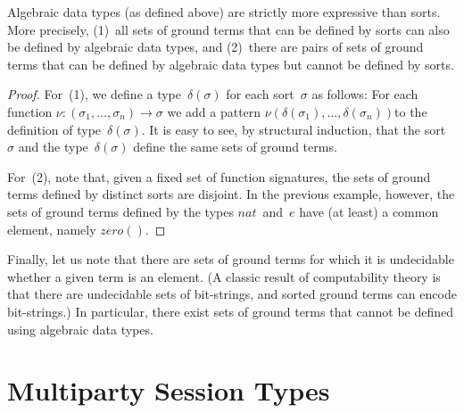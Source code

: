 \documentclass[a4paper,12pt,oneside,fleqn]{book} %
\newcommand{\rg}[1]{\marginpar{\tiny\raggedright\textcolor{blue}{\bf rg:} #1}}
\newcommand{\todo}[1]{[\textcolor{red}{TODO}: #1]}
\renewcommand{\rg}{}
\begin{document}
\begin{proposition}
Algebraic data types (as defined above) are strictly more expressive than
sorts. More precisely, (1)~all sets of ground terms that can be defined by
sorts can also be defined by algebraic data types, and (2)~there are pairs
of sets of ground terms that can be defined by algebraic data types but
cannot be defined by sorts.
\end{proposition}

\begin{proof}
For~(1), we define a type~$\delta(\sigma)$ for each sort~$\sigma$ as
follows: For each function $\nu:(\sigma_1,\ldots,\sigma_n)\to\sigma$ we add
a pattern $\nu(\delta(\sigma_1),\ldots,\delta(\sigma_n))$to the definition
of type~$\delta(\sigma)$. It is easy to see, by structural induction, that
the sort~$\sigma$ and the type~$\delta(\sigma)$ define the same sets of
ground terms.

For~(2), note that, given a fixed set of function signatures, the sets of
ground terms defined by distinct sorts are disjoint. In the previous
example, however, the sets of ground terms defined by the types
$\mathit{nat}$~and~$e$ have (at least) a common element, namely
$\mathit{zero}()$.
\end{proof}

Finally, let us note that there are sets of ground terms for which it is
undecidable whether a given term is an element.  (A classic result of
computability theory is that there are undecidable sets of bit-strings, and
sorted ground terms can encode bit-strings.) In particular, there exist
sets of ground terms that cannot be defined using algebraic data types.


\chapter{Multiparty Session Types} %

\end{document}
